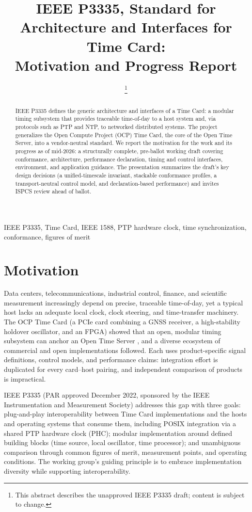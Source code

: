 \documentclass[
  conference,
  a4paper]{IEEEtran}
\title{IEEE P3335, Standard for Architecture and Interfaces for Time
Card:\\
Motivation and Progress Report}
\author{\IEEEauthorblockN{Ahmad Byagowi}
\IEEEauthorblockA{Open Compute Project, USA\\
ahmad.byagowi@ocproject.net}
\authorblockseparator{}
\IEEEauthorblockN{Denis Reilly}
\IEEEauthorblockA{Safran, USA\\
denis.reilly@gmail.com}
\authorblockseparator{}
\IEEEauthorblockN{Joseph Gwinn}
\IEEEauthorblockA{Raytheon, USA\\
joegwinn@comcast.net}
\authorblockseparator{}
\IEEEauthorblockN{Kang B Lee}
\IEEEauthorblockA{NIST, USA\\
kang.lee@nist.gov}

\thanks{This abstract describes the unapproved IEEE P3335 draft; content
is subject to change.}}
\date{}
\begin{document}
\maketitle
\begin{abstract}
IEEE P3335 defines the generic architecture and interfaces of a Time
Card: a modular timing subsystem that provides traceable time-of-day to
a host system and, via protocols such as PTP and NTP, to networked
distributed systems. The project generalizes the Open Compute Project
(OCP) Time Card, the core of the Open Time Server, into a vendor-neutral
standard. We report the motivation for the work and its progress as of
mid-2026: a structurally complete, pre-ballot working draft covering
conformance, architecture, performance declaration, timing and control
interfaces, environment, and application guidance. The presentation
summarizes the draft's key design decisions (a unified-timescale
invariant, stackable conformance profiles, a transport-neutral control
model, and declaration-based performance) and invites ISPCS review ahead
of ballot.
\end{abstract}

\begin{IEEEkeywords}
IEEE P3335, Time Card, IEEE 1588, PTP hardware clock, time synchronization,
conformance, figures of merit
\end{IEEEkeywords}

\section{Motivation}\label{motivation}

Data centers, telecommunications, industrial control, finance, and
scientific measurement increasingly depend on precise, traceable
time-of-day, yet a typical host lacks an adequate local clock, clock
steering, and time-transfer machinery. The OCP Time Card
\citep{ocp-timecard} (a PCIe card combining a GNSS receiver, a
high-stability holdover oscillator, and an FPGA) showed that an open,
modular timing subsystem can anchor an Open Time Server
\citep{byagowi2022timecard}, and a diverse ecosystem of commercial and
open implementations followed. Each uses product-specific signal
definitions, control models, and performance claims: integration effort
is duplicated for every card--host pairing, and independent comparison
of products is impractical.

IEEE P3335 \citep{p3335par} (PAR approved December 2022, sponsored by
the IEEE Instrumentation and Measurement Society) addresses this gap
with three goals: plug-and-play interoperability between Time Card
implementations and the hosts and operating systems that consume them,
including POSIX integration via a shared PTP hardware clock (PHC);
modular implementation around defined building blocks (time source,
local oscillator, time processor); and unambiguous comparison through
common figures of merit, measurement points, and operating conditions.
The working group's guiding principle is to embrace implementation
diversity while supporting interoperability.
\end{document}

